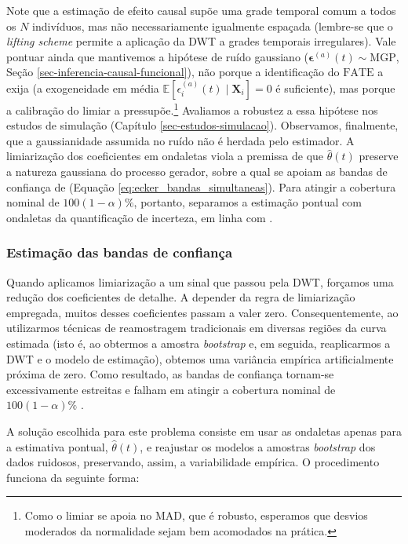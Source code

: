 Note que a estimação de efeito causal supõe uma grade temporal comum a todos os \(N\) indivíduos, mas não necessariamente igualmente espaçada (lembre-se que o \emph{lifting scheme} permite a aplicação da DWT a grades temporais irregulares). 
Vale pontuar ainda que mantivemos a hipótese de ruído gaussiano (\(\boldsymbol{\epsilon}^{(a)}(t) \sim \mathrm{MGP}\), Seção \ref{sec-inferencia-causal-funcional}), não porque a identificação do \(\mathrm{FATE}\) a exija (a exogeneidade em média \(\mathbb{E}[\epsilon_i^{(a)}(t) \mid \mathbf{X}_i] = 0\) é suficiente), mas porque a calibração do limiar a pressupõe.\footnote{Como o limiar se apoia no MAD, que é robusto, esperamos que desvios moderados da normalidade sejam bem acomodados na prática.} 
Avaliamos a robustez a essa hipótese nos estudos de simulação (Capítulo \ref{sec-estudos-simulacao}). 
Observamos, finalmente, que a gaussianidade assumida no ruído não é herdada pelo estimador. 
A limiarização dos coeficientes em ondaletas viola a premissa de que \(\hat{\theta}(t)\) preserve a natureza gaussiana do processo gerador, sobre a qual se apoiam as bandas de confiança de  (Equação \ref{eq:ecker_bandas_simultaneas}). 
Para atingir a cobertura nominal de \(100(1-\alpha)\%\), portanto, separamos a estimação pontual com ondaletas da quantificação de incerteza, em linha com .

\subsubsection{Estimação das bandas de confiança}\label{sec-bootstrap-ic}

Quando aplicamos limiarização a um sinal que passou pela DWT, forçamos uma redução dos coeficientes de detalhe. 
A depender da regra de limiarização empregada, muitos desses coeficientes passam a valer zero. 
Consequentemente, ao utilizarmos técnicas de reamostragem tradicionais em diversas regiões da curva estimada (isto é, ao obtermos a amostra \emph{bootstrap} e, em seguida, reaplicarmos a DWT e o modelo de estimação), obtemos uma variância empírica artificialmente próxima de zero. 
Como resultado, as bandas de confiança tornam-se excessivamente estreitas e falham em atingir a cobertura nominal de \(100(1 - \alpha)\%\) \cite{chatterjee_bootstrapping_2011}.

A solução escolhida para este problema consiste em usar as ondaletas apenas para a estimativa pontual, \(\hat{\theta}(t)\), e reajustar os modelos a amostras \emph{bootstrap} dos dados ruidosos, preservando, assim, a variabilidade empírica. 
O procedimento funciona da seguinte forma:


